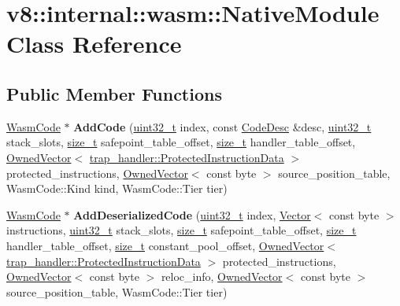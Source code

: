 \hypertarget{classv8_1_1internal_1_1wasm_1_1NativeModule}{}\section{v8\+:\+:internal\+:\+:wasm\+:\+:Native\+Module Class Reference}
\label{classv8_1_1internal_1_1wasm_1_1NativeModule}
\subsection*{Public Member Functions}
\begin{DoxyCompactItemize}
\item 
\mbox{\label{classv8_1_1internal_1_1wasm_1_1NativeModule_abf2b9da42f849a3dfdc3e928a1e4bb67}} 
\mbox{\hyperlink{classv8_1_1internal_1_1wasm_1_1WasmCode}{Wasm\+Code}} $\ast$ {\bfseries Add\+Code} (\mbox{\hyperlink{classuint32__t}{uint32\+\_\+t}} index, const \mbox{\hyperlink{structv8_1_1internal_1_1CodeDesc}{Code\+Desc}} \&desc, \mbox{\hyperlink{classuint32__t}{uint32\+\_\+t}} stack\+\_\+slots, \mbox{\hyperlink{classsize__t}{size\+\_\+t}} safepoint\+\_\+table\+\_\+offset, \mbox{\hyperlink{classsize__t}{size\+\_\+t}} handler\+\_\+table\+\_\+offset, \mbox{\hyperlink{classv8_1_1internal_1_1OwnedVector}{Owned\+Vector}}$<$ \mbox{\hyperlink{structv8_1_1internal_1_1trap__handler_1_1ProtectedInstructionData}{trap\+\_\+handler\+::\+Protected\+Instruction\+Data}} $>$ protected\+\_\+instructions, \mbox{\hyperlink{classv8_1_1internal_1_1OwnedVector}{Owned\+Vector}}$<$ const byte $>$ source\+\_\+position\+\_\+table, Wasm\+Code\+::\+Kind kind, Wasm\+Code\+::\+Tier tier)
\item 
\mbox{\label{classv8_1_1internal_1_1wasm_1_1NativeModule_ad1e70f491a0a6bf87a7c1cdbc5881349}} 
\mbox{\hyperlink{classv8_1_1internal_1_1wasm_1_1WasmCode}{Wasm\+Code}} $\ast$ {\bfseries Add\+Deserialized\+Code} (\mbox{\hyperlink{classuint32__t}{uint32\+\_\+t}} index, \mbox{\hyperlink{classv8_1_1internal_1_1Vector}{Vector}}$<$ const byte $>$ instructions, \mbox{\hyperlink{classuint32__t}{uint32\+\_\+t}} stack\+\_\+slots, \mbox{\hyperlink{classsize__t}{size\+\_\+t}} safepoint\+\_\+table\+\_\+offset, \mbox{\hyperlink{classsize__t}{size\+\_\+t}} handler\+\_\+table\+\_\+offset, \mbox{\hyperlink{classsize__t}{size\+\_\+t}} constant\+\_\+pool\+\_\+offset, \mbox{\hyperlink{classv8_1_1internal_1_1OwnedVector}{Owned\+Vector}}$<$ \mbox{\hyperlink{structv8_1_1internal_1_1trap__handler_1_1ProtectedInstructionData}{trap\+\_\+handler\+::\+Protected\+Instruction\+Data}} $>$ protected\+\_\+instructions, \mbox{\hyperlink{classv8_1_1internal_1_1OwnedVector}{Owned\+Vector}}$<$ const byte $>$ reloc\+\_\+info, \mbox{\hyperlink{classv8_1_1internal_1_1OwnedVector}{Owned\+Vector}}$<$ const byte $>$ source\+\_\+position\+\_\+table, Wasm\+Code\+::\+Tier tier)

\end{DoxyCompactItemize}
